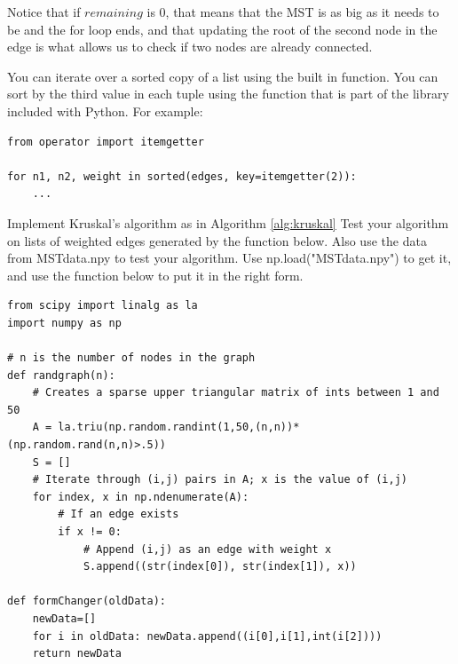 Notice that if $remaining$ is 0, that means that the MST is as big as it needs to be and the for loop ends, and that updating the root of the second node in the edge is what allows us to check if two nodes are already connected.

You can iterate over a sorted copy of a list using the built in  function.
You can sort by the third value in each tuple using the  function that is part of the  library included with Python.
For example:
\begin{lstlisting}
from operator import itemgetter

for n1, n2, weight in sorted(edges, key=itemgetter(2)):
    ...
\end{lstlisting}

\begin{problem}
Implement Kruskal's algorithm as in Algorithm \ref{alg:kruskal}
Test your algorithm on lists of weighted edges generated by the  function below. Also use the data from MSTdata.npy to test your algorithm.
Use np.load("MSTdata.npy") to get it, and use the  function below to put it in the right form.
\begin{lstlisting}
from scipy import linalg as la
import numpy as np

# n is the number of nodes in the graph
def randgraph(n):
    # Creates a sparse upper triangular matrix of ints between 1 and 50
    A = la.triu(np.random.randint(1,50,(n,n))*(np.random.rand(n,n)>.5))
    S = []
    # Iterate through (i,j) pairs in A; x is the value of (i,j)
    for index, x in np.ndenumerate(A):
        # If an edge exists
        if x != 0:
            # Append (i,j) as an edge with weight x
            S.append((str(index[0]), str(index[1]), x))

def formChanger(oldData):
    newData=[]
    for i in oldData: newData.append((i[0],i[1],int(i[2])))
    return newData
\end{lstlisting}
\end{problem}

